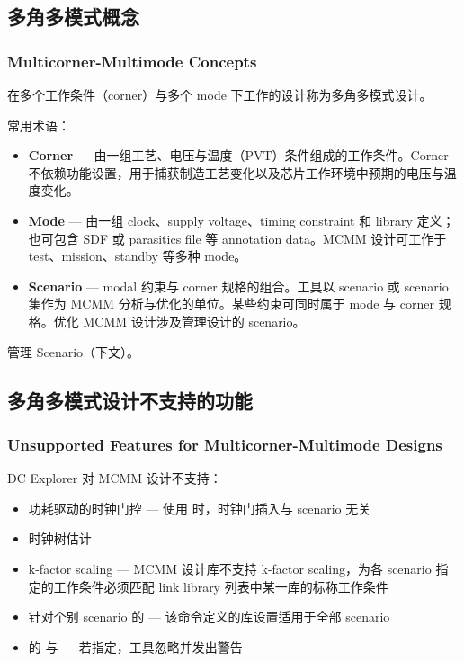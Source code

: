 \subsection{多角多模式概念}
\subsubsection*{Multicorner-Multimode Concepts}

在多个工作条件（corner）与多个 mode 下工作的设计称为多角多模式设计。

常用术语：
\begin{itemize}
  \item \textbf{Corner} — 由一组工艺、电压与温度（PVT）条件组成的工作条件。Corner 不依赖功能设置，用于捕获制造工艺变化以及芯片工作环境中预期的电压与温度变化。
  \item \textbf{Mode} — 由一组 clock、supply voltage、timing constraint 和 library 定义；也可包含 SDF 或 parasitics file 等 annotation data。MCMM 设计可工作于 test、mission、standby 等多种 mode。
  \item \textbf{Scenario} — modal 约束与 corner 规格的组合。工具以 scenario 或 scenario 集作为 MCMM 分析与优化的单位。某些约束可同时属于 mode 与 corner 规格。优化 MCMM 设计涉及管理设计的 scenario。
\end{itemize}

\begin{seeAlsoBox}
管理 Scenario（下文）。
\end{seeAlsoBox}

\subsection{多角多模式设计不支持的功能}
\subsubsection*{Unsupported Features for Multicorner-Multimode Designs}

DC Explorer 对 MCMM 设计不支持：
\begin{itemize}
  \item 功耗驱动的时钟门控 — 使用  时，时钟门插入与 scenario 无关
  \item 时钟树估计
  \item k-factor scaling — MCMM 设计库不支持 k-factor scaling，为各 scenario 指定的工作条件必须匹配 link library 列表中某一库的标称工作条件
  \item 针对个别 scenario 的  — 该命令定义的库设置适用于全部 scenario
  \item {} 的  与  — 若指定，工具忽略并发出警告
\end{itemize}

